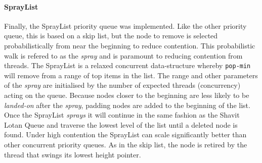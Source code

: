 \paragraph{SprayList} Finally, the SprayList priority queue was implemented.\cite{SprayList} Like the other priority queue, this is based on a skip list, but the node to remove is selected probabilistically from near the beginning to reduce contention. This probabilistic walk is refered to as the \textit{spray} and is paramount to reducing contention from threads. The SprayList is a relaxed concurrent data-structure whereby \texttt{pop-min} will remove from a range of top items in the list. The range and other parameters of the \textit{spray} are initialised by the number of expected threads (concurrency) acting on the queue. Because nodes closer to the beginning are less likely to be \textit{landed-on} after the \textit{spray}, padding nodes are added to the beginning of the list. Once the SprayList \textit{sprays} it will continue in the same fashion as the Shavit Lotan Queue and traverse the lowest level of the list until a deleted node is found. Under high contention the SprayList can scale significantly better than other concurrent priority queues. As in the skip list, the node is retired by the thread that swings its lowest height pointer.
